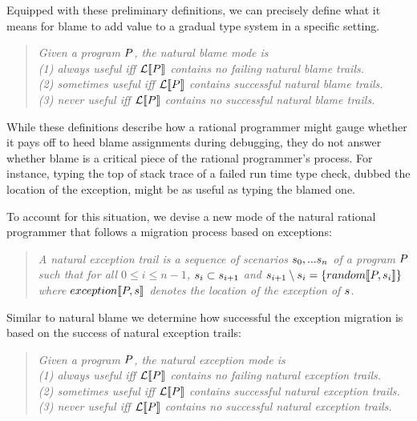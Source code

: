 Equipped with these preliminary definitions, we can precisely define what it means
for blame to add value to a gradual type system in a specific setting. 
\begin{quote}
\it
Given a program $P$, the natural blame mode is\\
(1) \emph{always useful} iff $\mathcal{L}\llbracket P\rrbracket$ contains no failing natural blame trails.\\
(2) \emph{sometimes useful} iff $\mathcal{L}\llbracket P\rrbracket$ contains successful natural blame trails.\\
(3) \emph{never useful} iff $\mathcal{L}\llbracket P\rrbracket$ contains no successful natural blame
trails.\\
\end{quote}

While these definitions describe how a rational programmer might gauge whether it
pays off to heed blame assignments during debugging, they do not answer whether
blame is a critical piece of the rational programmer's process.  For instance,
typing the top of stack trace of a failed run time type check, dubbed the
location of the exception, might be as useful as typing the blamed one.

To account for this situation, we devise a new mode of the natural rational
programmer that follows a migration process based on exceptions:
\begin{quote}
\it A natural exception trail is a sequence of scenarios $s_0,...s_n$ of a
program $P$ such that for all $0 \leq i \leq n - 1$, $s_i \subset
s_{i+1}$ and $s_{i+1} \setminus s_i = \{random\llbracket P, s_i\rrbracket\}$
where $exception\llbracket P, s\rrbracket$ denotes the location of the exception of $s$.
\end{quote}
Similar to natural blame we determine how successful the exception
migration is based on the success of natural exception trails: 
\begin{quote}
\it
Given a program $P$, the natural exception mode is\\
(1) \emph{always useful} iff $\mathcal{L}\llbracket P\rrbracket$ contains no failing
  natural exception trails.\\
(2) \emph{sometimes useful} iff $\mathcal{L}\llbracket P\rrbracket$ contains successful
  natural exception trails.\\
(3) \emph{never useful} iff $\mathcal{L}\llbracket P\rrbracket$ contains no successful natural
exception trails.\\
\end{quote}

